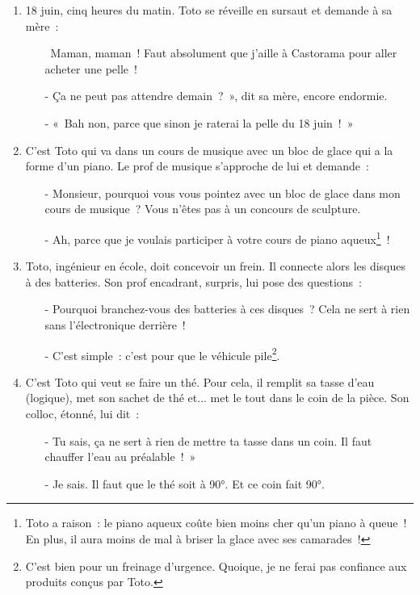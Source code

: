 \documentclass[10pt,a5paper,fullpage]{book}
\begin{document}
\begin{enumerate}
		\item 18 juin, cinq heures du matin. Toto se réveille en sursaut et demande à sa mère~:
		\begin{itemize}
			\item[ ] \guillemotleft~Maman, maman~! Faut absolument que j’aille à Castorama pour aller acheter une pelle~!
			\item[-] Ça ne peut pas attendre demain~? », dit sa mère, encore endormie.
			\item[-] « Bah non, parce que sinon je raterai la pelle du 18 juin~! » 
		\end{itemize}
		
		\item C’est Toto qui va dans un cours de musique avec un bloc de glace qui a la forme d’un piano. Le prof de musique s’approche de lui et demande~:
		\begin{itemize}
			\item[-] Monsieur, pourquoi vous vous pointez avec un bloc de glace dans mon cours de musique~? Vous n’êtes pas à un concours de sculpture.
			\item[-] Ah, parce que je voulais participer à votre cours de piano aqueux\footnote{Toto a raison~: le piano aqueux coûte bien moins cher qu’un piano à queue~! En plus, il aura moins de mal à briser la glace avec ses camarades~!}~!
		\end{itemize}
		
		\item Toto, ingénieur en école, doit concevoir un frein. Il connecte alors les disques à des batteries. Son prof encadrant, surpris, lui pose des questions~:
		\begin{itemize}
			\item[-] Pourquoi branchez-vous des batteries à ces disques~? Cela ne sert à rien sans l'électronique derrière~!
			\item[-] C'est simple~: c'est pour que le véhicule pile\footnote{C'est bien pour un freinage d'urgence. Quoique, je ne ferai pas confiance aux produits conçus par Toto.}.
		\end{itemize}
		
		\item C’est Toto qui veut se faire un thé. Pour cela, il remplit sa tasse d’eau (logique), met son sachet de thé et... met le tout dans le coin de la pièce. Son colloc, étonné, lui dit~:
		\begin{itemize}
			\item[-] Tu sais, ça ne sert à rien de mettre ta tasse dans un coin. Il faut chauffer l’eau au préalable~! »
			\item[-] Je sais. Il faut que le thé soit à 90°. Et ce coin fait 90°.  
		\end{itemize}
		

\end{enumerate}
\end{document}

